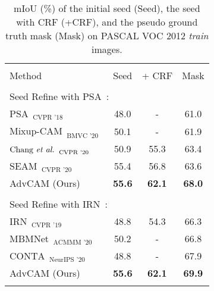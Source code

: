 \documentclass[final]{cvpr}
\begin{document}
\begin{table}[tbp]
\renewcommand{\arraystretch}{0.95}
  \centering
  \caption{mIoU (\%) of the initial seed (Seed), the seed with CRF (+CRF), and the pseudo ground truth mask (Mask) on PASCAL VOC 2012 \textit{train} images.}
  \vspace{-0.7em}
    \begin{tabular}{l@{\hskip 0.3in}c@{\hskip 0.1in}c@{\hskip 0.08in}c}
     \Xhline{1pt}\\[-0.95em]
    Method  &  Seed  & + CRF & Mask \\
    \hline\hline \\[-0.9em]
    \multicolumn{4}{l}{Seed Refine with PSA~\cite{ahn2018learning}:} \\
    $\text{PSA}_{\text{~~CVPR '18}}$~\cite{ahn2018learning} & 48.0 & - & 61.0 \\
    $\text{Mixup-CAM}_{\text{~~BMVC '20}}$~\cite{chang2020mixup} & 50.1 & - & 61.9 \\
    $\text{Chang \textit{et al.}}_{\text{~~CVPR '20}}$~\cite{chang2020weakly} & 50.9 & 55.3 & 63.4 \\
    $\text{SEAM}_{\text{~~CVPR '20}}$~\cite{wang2020self}  & 55.4 & 56.8& 63.6 \\
    AdvCAM (Ours) & \textbf{55.6}  & \textbf{62.1} & \textbf{68.0}\\
\hline\\[-0.9em]
    \multicolumn{4}{l}{Seed Refine with IRN~\cite{ahn2019weakly}:} \\
    $\text{IRN}_{\text{~~CVPR '19}}$~\cite{ahn2019weakly} & 48.8  & 54.3 & 66.3 \\
    $\text{MBMNet}_{\text{~~ACMMM '20}}$~\cite{liu2020weakly} & 50.2 & - & 66.8 \\
    $\text{CONTA}_{\text{~~NeurIPS '20}}$~\cite{zhang2020causal} & 48.8 & - & 67.9 \\

    AdvCAM (Ours) & \textbf{55.6}  & \textbf{62.1} & \textbf{69.9} \\
    \Xhline{1pt}
    \vspace{-2em}
    \end{tabular}\label{table_seed}\end{table}%
\end{document}
